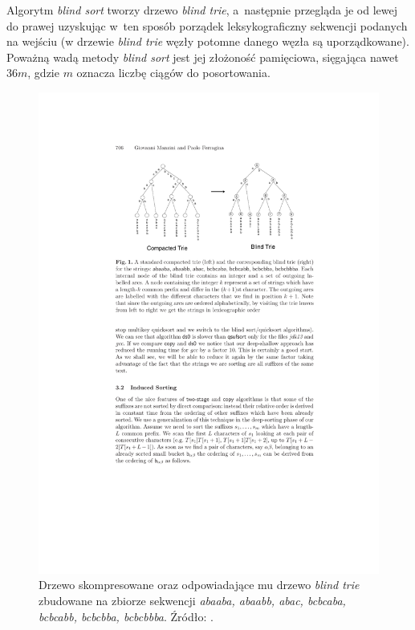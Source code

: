 Algorytm \emph{blind sort} tworzy drzewo \emph{blind trie}, a~następnie
przegląda je od lewej do prawej uzyskując w~ten sposób porządek leksykograficzny
sekwencji podanych na wejściu (w drzewie \emph{blind trie} węzły potomne danego
węzła są uporządkowane). Poważną wadą metody \emph{blind sort} jest jej
złożoność pamięciowa, sięgająca nawet $36m$, gdzie $m$ oznacza liczbę ciągów do
posortowania.

\begin{figure}[t]
    \begin{center}
       \includegraphics[width=.9\linewidth]{figures/blindtrie.pdf}
    \end{center}
    \caption{Drzewo skompresowane oraz odpowiadające mu drzewo \emph{blind trie}
    zbudowane na zbiorze sekwencji \emph{abaaba, abaabb, abac, bcbcaba, bcbcabb, bcbcbba, bcbcbbba}. 
    Źródło: \cite{MF}.}\label{rys:blind-trie}
\end{figure}

